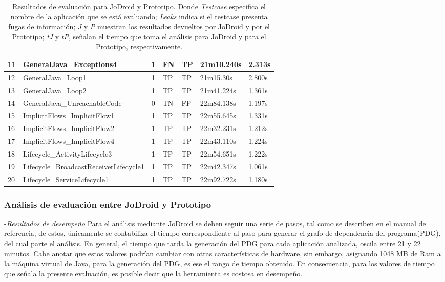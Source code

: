 \begin{table}[t]
\begin{center}
\begin{tabular}{|p{0.8cm}|p{6cm}|p{1cm}|p{0.8cm}|p{0.8cm}|p{}|p{1cm}|}
	\hline
	11 & GeneralJava\_Exceptions4 & 1 & FN  & TP & 21m10.240s &2.313s\\
	\hline
	12 & GeneralJava\_Loop1 & 1 & TP & TP &21m15.30s&2.800s\\
	\hline
	13 & GeneralJava\_Loop2 & 1 & TP & TP &21m41.224s&1.361s\\
	\hline
	14 & GeneralJava\_UnreachableCode & 0 & TN & FP &22m84.138s&1.197s\\
	\hline
	15 & ImplicitFlows\_ImplicitFlow1 & 1 & TP & TP &22m55.645s&1.331s\\
	\hline
	16 & ImplicitFlows\_ImplicitFlow2 & 1 & TP & TP &22m32.231s&1.212s\\
	\hline
	17 & ImplicitFlows\_ImplicitFlow4 & 1 & TP & TP &22m43.110s&1.224s\\
	\hline
	18 & Lifecycle\_ActivityLifecycle3 & 1 & TP & TP &22m54.651s&1.222s\\
	\hline
	19 & Lifecycle\_BroadcastReceiverLifecycle1 & 1 & TP & TP &22m42.347s&1.061s\\
	\hline
	20 & Lifecycle\_ServiceLifecycle1 & 1 & TP & TP &22m92.722s&1.180s\\
	\hline
\end{tabular}
\end{center}
\caption{Resultados de evaluación para JoDroid y Prototipo. Donde
\textit{Testcase} especifica el nombre de la aplicación que se está evaluando;
\textit{Leaks} indica si el testcase presenta fugas de información; \textit{J} y
\textit{P} muestran los resultados devueltos por JoDroid y por el Prototipo;
\textit{tJ} y \textit{tP}, señalan el tiempo que toma el análisis para JoDroid
y para el Prototipo, respectivamente.}
\label{tab:JoDroid-Prototipo}
\end{table}

\subsubsection{Análisis de evaluación entre JoDroid y Prototipo}
-\textit{Resultados de desempeño}\newline
Para el análisis mediante JoDroid se deben seguir una serie de pasos, tal como
se describen en el manual de referencia\cite{joDroidManual}, de estos,
únicamente se contabiliza el tiempo correspondiente al paso para generar el
grafo de dependencia del programa(PDG), del cual parte el análisis. En general,
el tiempo que tarda la generación del PDG para cada aplicación analizada, oscila
entre 21 y 22 minutos. Cabe anotar que estos valores podrían cambiar con otras
características de hardware, sin embargo, asignando 1048 MB de Ram a la máquina
virtual de Java, para la generación del PDG, es ese el rango de tiempo obtenido.
En consecuencia, para los valores de tiempo que señala la presente evaluación,
es posible decir que la herramienta es costosa en desempeño.

